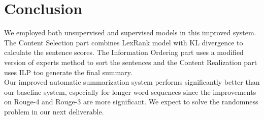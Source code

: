 \documentclass[11pt]{article}
\begin{document}
\section{Conclusion}

We employed both unsupervised and supervised models in this improved system. The Content Selection part combines LexRank model with KL divergence to calculate the sentence scores. The Information Ordering part uses a modified version of experts method to sort the sentences and the Content Realization part uses ILP too generate the final summary. \\
\indent
Our improved automatic summarization system performs significantly better than our baseline system, especially for longer word sequences since the improvements on Rouge-4 and Rouge-3 are more significant. We expect to solve the randomness problem in our next deliverable.
\end{document}
